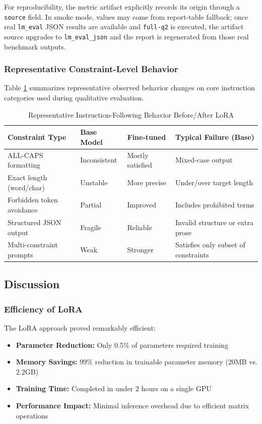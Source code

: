 For reproducibility, the metric artifact explicitly records its origin through a \texttt{source} field. In smoke mode, values may come from report-table fallback; once real \texttt{lm\_eval} JSON results are available and \texttt{full-q2} is executed, the artifact source upgrades to \texttt{lm\_eval\_json} and the report is regenerated from those real benchmark outputs.

\subsubsection{Representative Constraint-Level Behavior}
Table \ref{tab:q2_constraint_behavior} summarizes representative observed behavior changes on core instruction categories used during qualitative evaluation.

\begin{table}[t]
\caption{Representative Instruction-Following Behavior Before/After LoRA}
\begin{center}
\footnotesize
\setlength{\tabcolsep}{3pt}
\begin{tabular}{|p{}|p{}|p{}|p{}|}
\hline
\textbf{Constraint Type} & \textbf{Base Model} & \textbf{Fine-tuned} & \textbf{Typical Failure (Base)} \\
\hline
ALL-CAPS formatting & Inconsistent & Mostly satisfied & Mixed-case output \\
\hline
Exact length (word/char) & Unstable & More precise & Under/over target length \\
\hline
Forbidden token avoidance & Partial & Improved & Includes prohibited terms \\
\hline
Structured JSON output & Fragile & Reliable & Invalid structure or extra prose \\
\hline
Multi-constraint prompts & Weak & Stronger & Satisfies only subset of constraints \\
\hline
\end{tabular}
\label{tab:q2_constraint_behavior}
\end{center}
\end{table}

\subsection{Discussion}

\subsubsection{Efficiency of LoRA}
The LoRA approach proved remarkably efficient:
\begin{itemize}
    \item \textbf{Parameter Reduction:} Only 0.5\% of parameters required training
    \item \textbf{Memory Savings:} 99\% reduction in trainable parameter memory (20MB vs. 2.2GB)
    \item \textbf{Training Time:} Completed in under 2 hours on a single GPU
    \item \textbf{Performance Impact:} Minimal inference overhead due to efficient matrix operations
\end{itemize}

